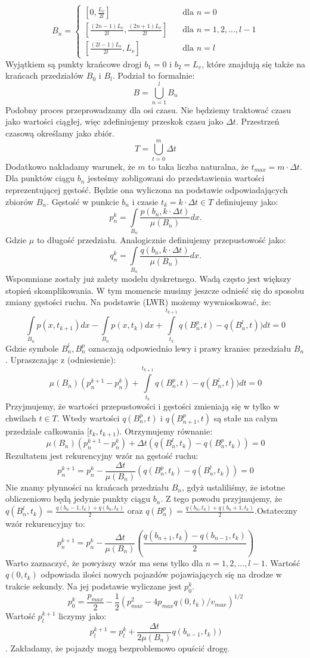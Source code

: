 \documentclass[11pt]{IEEEtran}
\begin{document}
\[ B_n =
  \begin{cases}
    [0,\frac{L_v}{2l}]       & \quad \text{dla } n=0 \\
        [\frac{(2n-1)L_v}{2l},\frac{(2n+1)L_v}{2l}]  & \quad \text{dla } n=1,2,...,l-1 \\
    [\frac{(2l-1)L_v}{2l},L_v] & \quad \text{dla } n=l
  \end{cases}
\]
Wyjątkiem są punkty krańcowe drogi $b_1=0$ i $b_2=L_v$, które znajdują się także na krańcach przedziałów $B_0$ i $B_l$. Podział to formalnie:
$$\displaystyle B=\bigcup_{n=1}^{l}B_n$$
Podobny proces przeprowadzamy dla osi czasu. Nie będziemy traktować czasu jako wartości ciągłej, więc zdefiniujemy przeskok czasu jako $\Delta t$. Przestrzeń czasową określamy jako zbiór.
$$\displaystyle T=\bigcup_{t=0}^{m} \Delta t$$
Dodatkowo nakładamy warunek, że $m$ to taka liczba naturalna, że $t_{max}=m \cdot \Delta t$.
Dla punktów ciągu $b_n$ jesteśmy zobligowani do przedstawienia wartości reprezentującej gęstość. Będzie ona wyliczona na podstawie odpowiadających zbiorów $B_n$. Gęstość w punkcie $b_n$ i czasie $t_k=k\cdot \Delta t \in T$ definiujemy jako:
$$p_{n}^{k}=\int\limits_{B_n} {\frac{p(b_n,k \cdot \Delta t)}{\mu(B_n)}dx}.$$
Gdzie $\mu$ to długość przedziału. 
Analogicznie definiujemy przepustowość jako:
$$q_{n}^{k}=\int\limits_{B_n} {\frac{q(b_n,k \cdot \Delta t)}{\mu(B_n)}dx}.$$
Wspomniane zostały już zalety modelu dyskretnego. Wadą często jest większy stopień skomplikowania. W tym momencie musimy jeszcze odnieść się do sposobu zmiany gęstości ruchu. Na podstawie (LWR) możemy wywnioskować, że:
$$\int\limits_{B_n} {p(x,t_{k+1})dx-\int\limits_{B_n}p(x,t_{k})dx} +\int\limits_{t_k}^{t_{k+1}} q(B_{n}^{p},t)-q(B_n^{l},t))dt=0$$
Gdzie symbole $B_n^l, B_n^p$ oznaczają odpowiednio lewy i prawy kraniec przedziału $B_n$. Upraszczając z (odniesienie):
$$\mu(B_n)(p_n^{k+1}-p_n^{k}) +\int\limits_{t_k}^{t_{k+1}} q(B_{n}^{p},t)-q(B_n^{l},t))dt=0$$
Przyjmujemy, że wartości przepustowości i gęstości zmieniają się w tylko w chwilach $t\in T$. Wtedy wartości $q(B_{n}^{p},t)$ i $q(B_{n+1}^{p},t)$ są stałe na całym przedziale całkowania $[t_k,t_{k+1})$. Otrzymujemy równanie:
$$\mu(B_n)(p_n^{k+1}-p_n^{k})  + \Delta t (q(B_{n}^{l},t_k)-q(B_n^p,t_k))=0$$
Rezultatem jest rekurencyjny wzór na gęstość ruchu:
$$p^{k+1}_n=p^{k}_n -\frac{\Delta t}{\mu(B_n)} (q(B_{n}^{p},t_k)-q(B_{n}^{l},t_k))=0$$
Nie znamy płynności na krańcach przedziału $B_n$, gdyż ustaliliśmy, że istotne obliczeniowo będą jedynie punkty ciągu $b_n$. Z tego powodu przyjmujemy, że $q(B_n^l,t_k)=\frac{q(b_n-1,t_k)+q(b_n,t_k)}{2}$ oraz $q(B_n^p)=\frac{q(b_n,t_k)+q(b_n+1,t_k)}{2}$.Ostateczny wzór rekurencyjny to:
$$p^{k+1}_n=p^{k}_n -\frac{\Delta t}{\mu(B_n)}(\frac{q(b_{n+1},t_k)-q(b_{n-1},t_k)}{2})$$
Warto zaznaczyć, że powyższy wzór ma sens tylko dla $n=1,2,...,l-1$. Wartość $q(0,t_k)$ odpowiada ilości nowych pojazdów pojawiających się na drodze w trakcie sekundy. Na jej podstawie wyliczane jest $p_0^k$. 
$$p_0^k=\frac{p_{max}}{2}-\frac{1}{2}(p_{max}^2-4p_{max}q(0,t_k)/v_{max})^{1/2}$$
Wartość $p^{k+1}_{l}$ liczymy jako:
$$p^{k+1}_l=p^{k}_l +\frac{\Delta t}{2\mu(B_n)}q(b_{n-1},t_k))$$. Zakładamy, że pojazdy mogą bezproblemowo opuścić drogę.
\end{document}
